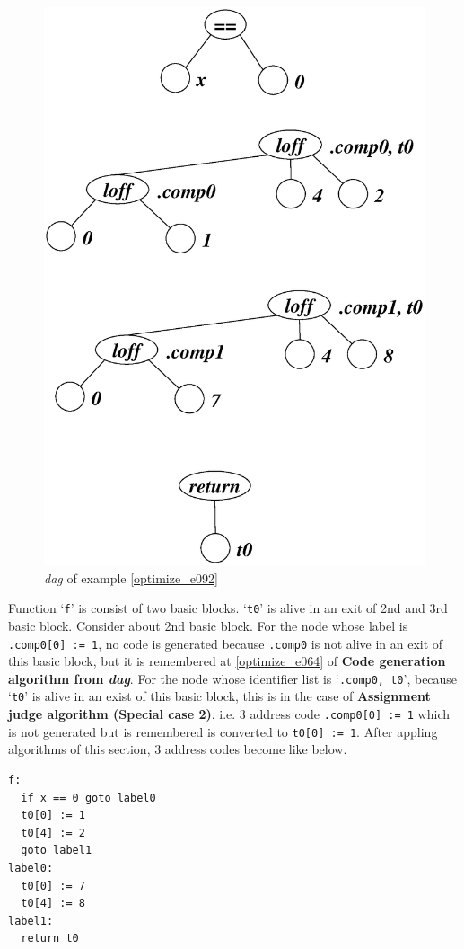 \begin{Example}
\begin{figure}[htbp]
\begin{center}
\begin{latexonly}
\includegraphics[width=0.857\linewidth,height=1.0\linewidth]{opt040.eps}
\end{latexonly}
\caption{{\em dag} of example \ref{optimize_e092}}
\label{optimize_e093}
\end{center}
\end{figure}
Function `{\tt{f}}' is consist of two basic blocks.
`{\tt{t0}}' is
alive in an exit of 2nd and 3rd basic block.
Consider about 2nd basic block.
For the node whose label is {\tt{.comp0[0] := 1}},
no code is generated because {\tt{.comp0}} is not alive
in an exit of this basic block, but it is remembered 
at \ref{optimize_e064} of
{\bf Code generation algorithm from {\em dag}}.
For the node whose identifier list is `{\tt{.comp0, t0}}',
because `{\tt{t0}}' is alive in an exist of this basic block,
this is in the case of {\bf Assignment judge algorithm (Special case 2)}.
i.e. 3 address code {\tt{.comp0[0] := 1}} which is not generated
but is remembered is converted to {\tt{t0[0] := 1}}.
After appling algorithms of this section,
3 address codes become like below.
\begin{verbatim}
f:
  if x == 0 goto label0
  t0[0] := 1
  t0[4] := 2
  goto label1
label0:
  t0[0] := 7
  t0[4] := 8
label1:
  return t0
\end{verbatim}
\end{Example}

